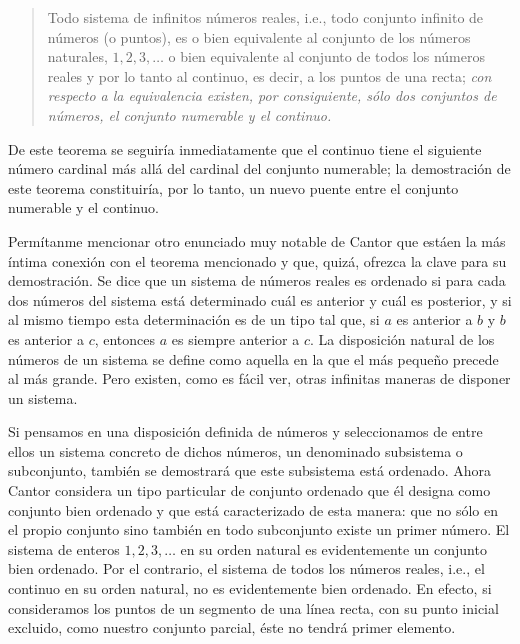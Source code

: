\documentclass[a4paper, 12pt]{article}
\begin{document}
\begin{quote} \small

Todo sistema de infinitos números reales, i.e., todo conjunto infinito de números (o puntos), es o bien equivalente al conjunto de los números naturales, $1, 2, 3, \dots$ o bien equivalente al conjunto de todos los números reales y por lo tanto al continuo, es decir, a los puntos de una recta; \textit{con respecto a la equivalencia existen, por consiguiente, sólo dos conjuntos de números, el conjunto numerable y el continuo. }

\end{quote}

De este teorema se seguiría inmediatamente que el continuo tiene el siguiente número cardinal más allá del cardinal del conjunto numerable; la demostración de este teorema constituiría, por lo tanto, un nuevo puente entre el conjunto numerable y el continuo. 

Permítanme mencionar otro enunciado muy notable de Cantor que está\linebreak en la más íntima conexión con el teorema mencionado y que, quizá, ofrezca la clave para su demostración. Se dice que un sistema de números reales es ordenado si para cada dos números del sistema está determinado cuál es anterior y cuál es posterior, y si al mismo tiempo esta determinación es de un tipo tal que, si $a$ es anterior a $b$ y $b$ es anterior a $c$, entonces $a$ es siempre anterior a $c$. La disposición natural de los números de un sistema se define como aquella en la que el más pequeño precede al más grande. Pero existen, como es fácil ver, otras infinitas maneras de disponer un sistema. 

Si pensamos en una disposición definida de números y seleccionamos de entre ellos un sistema concreto de dichos números, un denominado subsistema o subconjunto, también se demostrará que este subsistema está ordenado. Ahora Cantor considera un tipo particular de conjunto ordenado que él designa como conjunto bien ordenado y que está caracterizado de esta manera: que no sólo en el propio conjunto sino también en todo subconjunto existe un primer número. El sistema de enteros $1,2, 3,\dots$ en su orden natural es evidentemente un conjunto bien ordenado. Por el contrario, el sistema de todos los números reales, i.e., el continuo en su orden natural, no es evidentemente bien ordenado. En efecto, si consideramos los puntos de un segmento de una línea recta, con su punto inicial excluido, como nuestro conjunto parcial, éste no tendrá primer elemento. 
\end{document}

